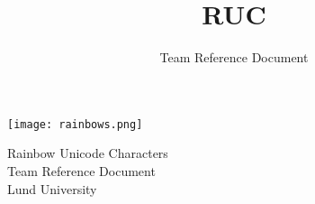 \documentclass[8pt,a4paper,landscape,oneside]{amsart}
\title{RUC}
\subtitle{Team Reference Document}
\date{\ddmmyyyydate{\today{}}}
\begin{document}
\thispagestyle{fancy}
\begin{titlingpage} %
\begin{center}
  \texttt{[image: rainbows.png]}\\
  \begin{Large}
    Rainbow Unicode Characters \\
    Team Reference Document \\
    Lund University

  \end{Large}
\end{center}

\begin{multicols*}{2}
\vspace{-3em}
\tableofcontents
\end{multicols*}
\end{titlingpage}
\end{document}
